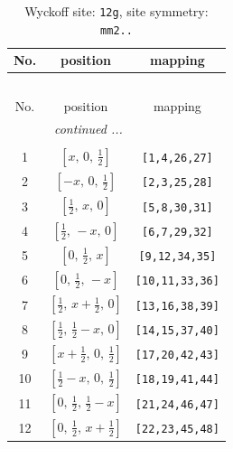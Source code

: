 \documentclass[fleqn,8pt]{jsarticle}
\begin{document}
\begin{longtable}{ccc}
\caption{Wyckoff site: {\tt 12g}, site symmetry: {\tt mm2..}}
 \\
 \hline \hline
No. & position & mapping \\ \hline \endfirsthead

\multicolumn{2}{l}{\tablename\ \thetable{}} \\
 \hline \hline
No. & position & mapping \\ \hline \endhead

 \hline \hline
\multicolumn{2}{r}{\footnotesize\it continued ...} \\ \endfoot

 \hline \hline
\multicolumn{2}{r}{} \\ \endlastfoot

1 & $\left[ x,\, 0,\, \frac{1}{2} \right]$ & {\tt [1,4,26,27]} \\ \hline
2 & $\left[ - x,\, 0,\, \frac{1}{2} \right]$ & {\tt [2,3,25,28]} \\ \hline
3 & $\left[ \frac{1}{2},\, x,\, 0 \right]$ & {\tt [5,8,30,31]} \\ \hline
4 & $\left[ \frac{1}{2},\, - x,\, 0 \right]$ & {\tt [6,7,29,32]} \\ \hline
5 & $\left[ 0,\, \frac{1}{2},\, x \right]$ & {\tt [9,12,34,35]} \\ \hline
6 & $\left[ 0,\, \frac{1}{2},\, - x \right]$ & {\tt [10,11,33,36]} \\ \hline
7 & $\left[ \frac{1}{2},\, x + \frac{1}{2},\, 0 \right]$ & {\tt [13,16,38,39]} \\ \hline
8 & $\left[ \frac{1}{2},\, \frac{1}{2} - x,\, 0 \right]$ & {\tt [14,15,37,40]} \\ \hline
9 & $\left[ x + \frac{1}{2},\, 0,\, \frac{1}{2} \right]$ & {\tt [17,20,42,43]} \\ \hline
10 & $\left[ \frac{1}{2} - x,\, 0,\, \frac{1}{2} \right]$ & {\tt [18,19,41,44]} \\ \hline
11 & $\left[ 0,\, \frac{1}{2},\, \frac{1}{2} - x \right]$ & {\tt [21,24,46,47]} \\ \hline
12 & $\left[ 0,\, \frac{1}{2},\, x + \frac{1}{2} \right]$ & {\tt [22,23,45,48]} \\
\end{longtable}
\renewcommand{\arraystretch}{1.2}
\end{document}
